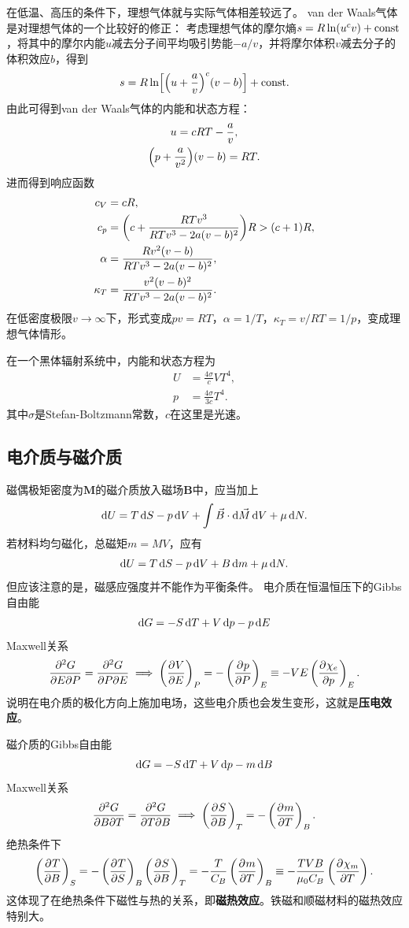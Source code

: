 在低温、高压的条件下，理想气体就与实际气体相差较远了。
van der Waals气体是对理想气体的一个比较好的修正：
考虑理想气体的摩尔熵$s=R\ln(u^cv)+\const$，将其中的摩尔内能$u$减去分子间平均吸引势能$-a/v$，并将摩尔体积$v$减去分子的体积效应$b$，得到
\begin{equation}
	s=R\ln\Bigfkh{\Bigkh{u+\frac av}^c(v-b)}+\const.
\end{equation}
由此可得到van der Waals气体的内能和状态方程：
\begin{subequations}
	\begin{gather}
		u=cRT-\frac av,\\
		\Bigkh{p+\frac a{v^2}}(v-b)=RT.
	\end{gather}
\end{subequations}
进而得到响应函数
\begin{subequations}
	\begin{align}
		c_V&=cR,\\
		c_p&=\biggkh{c+\frac{RTv^3}{RTv^3-2a(v-b)^2}}R>(c+1)R,\\
		\alpha&=\frac{Rv^2(v-b)}{RTv^3-2a(v-b)^2},\\
		\kappa_T&=\frac{v^2(v-b)^2}{RTv^3-2a(v-b)^2}.
	\end{align}
\end{subequations}
在低密度极限$v\to\infty$下，形式变成$pv=RT$，$\alpha=1/T$，$\kappa_T=v/RT=1/p$，变成理想气体情形。


在一个黑体辐射系统中，内能和状态方程为
\begin{subequations}
	\begin{align}
		U&=\frac{4\sigma}cVT^4,\\
		p&=\frac{4\sigma}{3c}T^4.
	\end{align}
\end{subequations}
其中$\sigma$是Stefan-Boltzmann常数，$c$在这里是光速。

\subsection{电介质与磁介质}

磁偶极矩密度为$\bm M$的磁介质放入磁场$\bm B$中，应当加上
\[\d U=T\d S-p\d V+\int\vec B\cdot\d\vec M\d V+\mu\d N.\]
若材料均匀磁化，总磁矩$m=MV$，应有
\[\d U=T\d S-p\d V+B\d m+\mu\d N.\]
但应该注意的是，磁感应强度并不能作为平衡条件。
	电介质在恒温恒压下的Gibbs自由能
\[\d G=-S\d T+V\d p-p\d E\]
Maxwell关系
\[\pw GEP=\pw GPE\implies\kh{\pv VE}_P=-\kh{\pv pP}_E\equiv-VE\kh{\pv{\chi_e}p}_E.\]
说明在电介质的极化方向上施加电场，这些电介质也会发生变形，这就是\textbf{压电效应}。

磁介质的Gibbs自由能
\[\d G=-S\d T+V\d p-m\d B\]
Maxwell关系
\[\pw GBT=\pw GTB\implies\kh{\pv SB}_T=-\kh{\pv mT}_B.\]
绝热条件下%
\[\kh{\pv TB}_S=-\kh{\pv TS}_B\kh{\pv SB}_T=-\frac T{C_B}\kh{\pv mT}_B\equiv-\frac{TVB}{\mu_0C_B}\kh{\pv{\chi_m}T}.\]
这体现了在绝热条件下磁性与热的关系，即\textbf{磁热效应}。铁磁和顺磁材料的磁热效应特别大。

